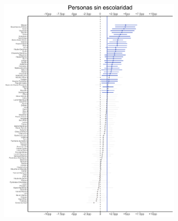\begin{figure}
	~
	\begin{subfigure}{0.45\textwidth}
	\includegraphics[width = \textwidth]{Figs/Efectos/Efectos_Dip1_Modelo_H}
	\end{subfigure}
	~
	\begin{subfigure}{0.45\textwidth}

\end{subfigure}
\end{figure}
